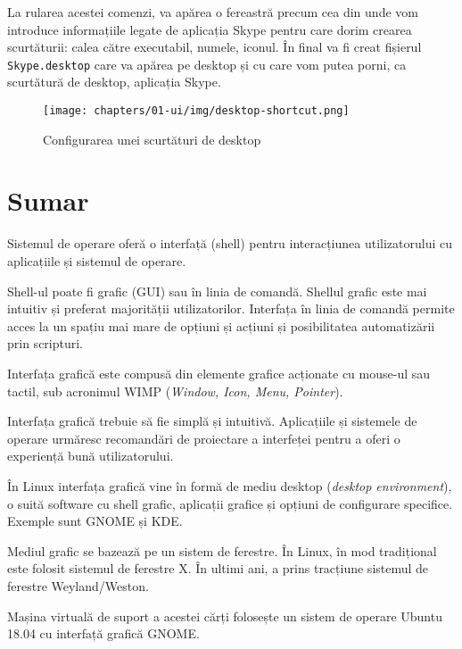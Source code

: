 
La rularea acestei comenzi, va apărea o fereastră precum cea din  unde vom introduce informațiile legate de aplicația Skype pentru care dorim crearea scurtăturii: calea către executabil, numele, iconul. În final va fi creat fișierul \texttt{Skype.desktop} care va apărea pe desktop și cu care vom putea porni, ca scurtătură de desktop, aplicația Skype.

\begin{figure}[!htbp]
  \centering
  \texttt{[image: chapters/01-ui/img/desktop-shortcut.png]}
  \caption{Configurarea unei scurtături de desktop}
  \label{fig:ui:desktop-shortcut}
\end{figure}

\section{Sumar}
\label{sec:ui:summary}

Sistemul de operare oferă o interfață (shell) pentru interacțiunea utilizatorului cu aplicațiile și sistemul de operare.

Shell-ul poate fi grafic (GUI) sau în linia de comandă. Shellul grafic este mai intuitiv și preferat majorității utilizatorilor. Interfața în linia de comandă permite acces la un spațiu mai mare de opțiuni și acțiuni și posibilitatea automatizării prin scripturi.

Interfața grafică este compusă din elemente grafice acționate cu mouse-ul sau tactil, sub acronimul WIMP (\textit{Window, Icon, Menu, Pointer}).

Interfața grafică trebuie să fie simplă și intuitivă. Aplicațiile și sistemele de operare urmăresc recomandări de proiectare a interfeței pentru a oferi o experiență bună utilizatorului.

În Linux interfața grafică vine în formă de mediu desktop (\textit{desktop environment}), o suită software cu shell grafic, aplicații grafice și opțiuni de configurare specifice. Exemple sunt GNOME și KDE.

Mediul grafic se bazează pe un sistem de ferestre. În Linux, în mod tradițional este folosit sistemul de ferestre X. În ultimi ani, a prins tracțiune sistemul de ferestre Weyland/Weston.

Mașina virtuală de suport a acestei cărți folosește un sistem de operare Ubuntu 18.04 cu interfață grafică GNOME.
